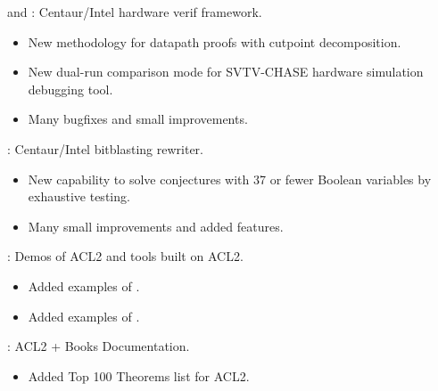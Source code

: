 \begin{frame}

\implibtitle

 and :
Centaur/Intel hardware verif framework.
\begin{itemize}
\item New methodology for datapath proofs with cutpoint decomposition.
\item New dual-run comparison mode for SVTV-CHASE hardware simulation debugging tool.
\item Many bugfixes and small improvements.
\end{itemize}

:
Centaur/Intel bitblasting rewriter.
\begin{itemize}
\item New capability to solve conjectures with 37 or fewer Boolean variables by exhaustive testing.
\item Many small improvements and added features.
\end{itemize}

\end{frame}


\begin{frame}

\implibtitle

:
Demos of ACL2 and tools built on ACL2.
\begin{itemize}
\item Added examples of .
\item Added examples of .
\end{itemize}
\end{frame}


\begin{frame}

\implibtitle

:
ACL2 + Books Documentation.
\begin{itemize}
\item Added Top 100 Theorems list for ACL2.
\end{itemize}
\end{frame}


